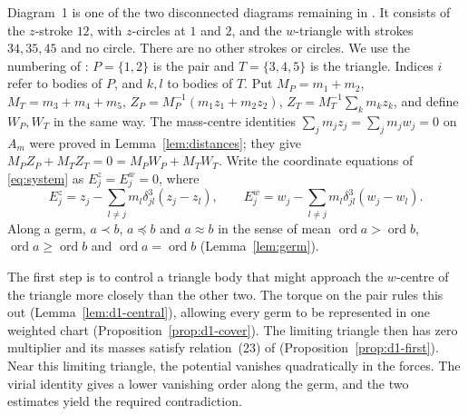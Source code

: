 \documentclass[Threeside,11pt]{article}
\theoremstyle{definition}
\theoremstyle{remark}
\numberwithin{equation}{section}
\theoremstyle{remark}
\newcommand{\ord}{\operatorname{ord}}
\begin{document}
{Diagram~1 is one of the two disconnected diagrams remaining in \cite[\S7.1, p.~565]{AK}.
It consists of the $z$-stroke $12$, with $z$-circles at $1$ and $2$, and the $w$-triangle
with strokes $34,35,45$ and no circle.  There are no other strokes or circles.
We use the numbering of \cite[\S8.1]{AK}: $P=\{1,2\}$ is the pair and $T=\{3,4,5\}$ is the
triangle.  Indices $i$ refer to bodies of $P$, and $k,l$ to bodies of $T$.  Put
$M_P=m_1+m_2$, $M_T=m_3+m_4+m_5$, $Z_P=M_P^{-1}(m_1z_1+m_2z_2)$,
$Z_T=M_T^{-1}\sum_km_kz_k$, and define $W_P,W_T$ in the same way.  The mass-centre identities
$\sum_jm_jz_j=\sum_jm_jw_j=0$ on $A_m$ were proved in Lemma~\ref{lem:distances}; they give
$M_PZ_P+M_TZ_T=0=M_PW_P+M_TW_T$.  Write the coordinate equations of \eqref{eq:system} as
$E^z_j=E^w_j=0$, where}
\[
  E^z_j=z_j-\sum_{l\ne j}m_l\delta_{jl}^3(z_j-z_l),\qquad
  E^w_j=w_j-\sum_{l\ne j}m_l\delta_{jl}^3(w_j-w_l).
\]
Along a germ, $a\prec b$, $a\preccurlyeq b$ and $a\approx b$ in the sense of \cite[\S3]{AK} mean
$\ord a>\ord b$, $\ord a\ge\ord b$ and $\ord a=\ord b$ (Lemma~\ref{lem:germ}).

{The first step is to control a triangle body that might approach the $w$-centre of the triangle
more closely than the other two.  The torque on the pair rules this out
(Lemma~\ref{lem:d1-central}), allowing every germ to be represented in one weighted chart
(Proposition~\ref{prop:d1-cover}).  The limiting triangle then has zero multiplier and its
masses satisfy relation~(23) of \cite[\S8.1]{AK} (Proposition~\ref{prop:d1-first}).
Near this limiting triangle, the potential vanishes quadratically in the forces.
The virial identity gives a lower vanishing order along the germ, and the two estimates
yield the required contradiction.}
\end{document}

